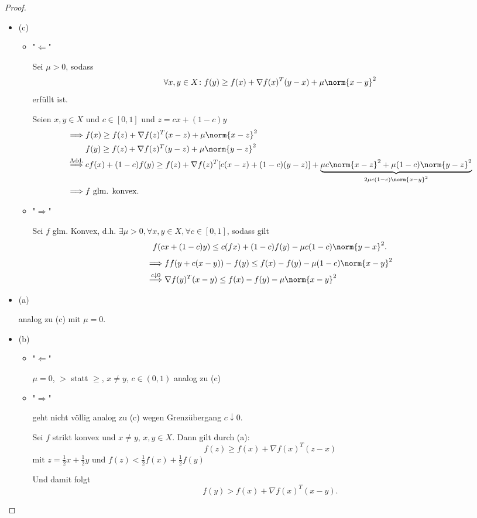\begin{proof}
\label{thm:konvexcharakterisierungbeweis}

\begin{itemize}[label=]
	Wir beweisen zunächst Fall (c), da der Rest schnell aus diesem Fall folgt.
	\item (c)
		\begin{itemize}[label=]
			\item "$\Leftarrow$"

 		Sei $\mu>0$, sodass 
		\[
		\forall x,y \in X \colon f(y)\geq f(x) + \nabla f(x)^{T}(y-x) + \mu \norm{x-y} ^2
		\] 
		erfüllt ist.

Seien $x,y \in X$ und $c \in [0,1]$ und $z = cx +(1-c)y$
\begin{align*}
	\implies & f(x) \geq f(z) + \nabla f(z)^{T}(x-z) + \mu \norm{x-z} ^2 \\
			 &f(y) \geq f(z) + \nabla f(z)^{T}(y-z) + \mu \norm{y-z} ^2 \\
	\overset{\text{Add.}}{\implies} &cf(x) + (1-c)f(y) \geq f(z) + \nabla f(z)^{T}[c(x-z) + (1-c)(y-z)] +  \underbrace{\mu c \norm{x-z} ^2 + \mu(1-c) \norm{y-z} ^2}_{2\mu c(1-c) \norm{x-y} ^2}  \\
	\implies &f \text{ glm. konvex.}
\end{align*}

\item "$\Rightarrow$"

	Sei $f$ glm. Konvex, d.h. $\exists \mu > 0, \forall x,y \in X, \forall c \in [0,1]$, sodass gilt
	\[
	f(cx+(1-c)y) \leq c(fx) + (1-c)f(y) - \mu  c(1-c) \norm{y-x} ^2
	.\] 
\begin{align*}
	\implies &f f(y+ c(x-y)) - f(y) \leq f(x) - f(y) - \mu (1-c)\norm{x-y}^2 \\
	\overset{c \downarrow 0}{\implies} & \nabla f(y)^{T}(x-y) \leq f(x) - f(y) - \mu \norm{x-y} ^2
\end{align*}
		\end{itemize}

	\item (a)

		analog zu (c) mit $\mu = 0$.

	\item (b)

		\begin{itemize}[label=]
			\item "$\Leftarrow$"

 $\mu=0$, $>$ statt $\geq$, $x \neq y$, $c \in(0,1)$ analog zu (c)

 \item "$\Rightarrow$"

 geht nicht völlig analog zu (c) wegen Grenzübergang $c \downarrow 0$.

 Sei $f$ strikt konvex und $x\neq y$, $x,y \in X$. Dann gilt durch (a):
\[
	f(z) \geq f(x) + \nabla f(x)^{T}(z-x)
\] 
$  \text{mit }z=\frac{1}{2}x + \frac{1}{2}y \text{ und } f(z) < \frac{1}{2}f(x) + \frac{1}{2}f(y)$ 

Und damit folgt
\[
	f(y) > f(x) + \nabla f(x)^{T}(x-y)
.\] 
	\end{itemize}
\end{itemize}

\end{proof}

